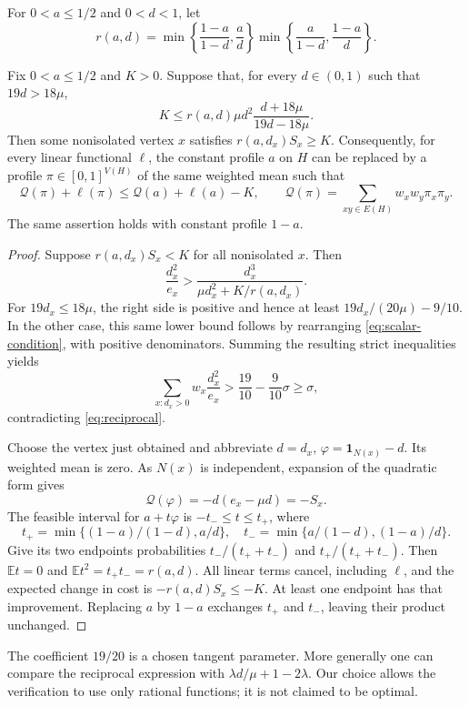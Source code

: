 \documentclass[12pt]{article}
\newcommand{\cost}{\mathcal Q}
\newcommand{\E}{\mathbb E}
\newcommand{\ind}{\mathbf 1}
\begin{document}
For $0<a\le1/2$ and $0<d<1$, let
\begin{equation}\label{eq:radii}
 r(a,d)=
 \min\left\{\frac{1-a}{1-d},\frac a d\right\}
 \min\left\{\frac a{1-d},\frac{1-a}d\right\}.
\end{equation}

\begin{lemma}\label{lem:tangent}
Fix $0<a\le1/2$ and $K>0$. Suppose that, for every $d\in(0,1)$ such that
$19d>18\mu$,
\begin{equation}\label{eq:scalar-condition}
 K\le r(a,d)\mu d^2\frac{d+18\mu}{19d-18\mu}.
\end{equation}
Then some nonisolated vertex $x$ satisfies $r(a,d_x)S_x\ge K$.
Consequently, for every linear functional $\ell$, the constant profile
$a$ on $H$ can be replaced by a profile $\pi\in[0,1]^{V(H)}$ of the same
weighted mean such that
\[
 \cost(\pi)+\ell(\pi)\le\cost(a)+\ell(a)-K,
 \qquad \cost(\pi)=\sum_{xy\in E(H)}w_xw_y\pi_x\pi_y.
\]
The same assertion holds with constant profile $1-a$.
\end{lemma}

\begin{proof}
Suppose $r(a,d_x)S_x<K$ for all nonisolated $x$. Then
\[
 \frac{d_x^2}{e_x}>
 \frac{d_x^3}{\mu d_x^2+K/r(a,d_x)}.
\]
For $19d_x\le18\mu$, the right side is positive and hence at least
$19d_x/(20\mu)-9/10$. In the other case, this same lower bound follows
by rearranging \eqref{eq:scalar-condition}, with positive denominators.
Summing the resulting strict inequalities yields
\[
 \sum_{x:d_x>0}w_x\frac{d_x^2}{e_x}
 >\frac{19}{10}-\frac9{10}\sigma\ge\sigma,
\]
contradicting \eqref{eq:reciprocal}.

Choose the vertex just obtained and abbreviate $d=d_x$,
$\varphi=\ind_{N(x)}-d$. Its weighted mean is zero. As $N(x)$ is
independent, expansion of the quadratic form gives
\[
 \cost(\varphi)=-d(e_x-\mu d)=-S_x.
\]
The feasible interval for $a+t\varphi$ is $-t_-\le t\le t_+$, where
\[
 t_+=\min\{(1-a)/(1-d),a/d\},\quad
 t_-=\min\{a/(1-d),(1-a)/d\}.
\]
Give its two endpoints probabilities $t_-/(t_++t_-)$ and
$t_+/(t_++t_-)$. Then $\E t=0$ and $\E t^2=t_+t_-=r(a,d)$.
All linear terms cancel, including $\ell$, and the expected change in
cost is $-r(a,d)S_x\le-K$. At least one endpoint has that improvement.
Replacing $a$ by $1-a$ exchanges $t_+$ and $t_-$, leaving their product
unchanged.
\end{proof}

The coefficient $19/20$ is a chosen tangent parameter. More generally one
can compare the reciprocal expression with
$\lambda d/\mu+1-2\lambda$. Our choice allows the verification to use
only rational functions; it is not claimed to be optimal.
\end{document}
